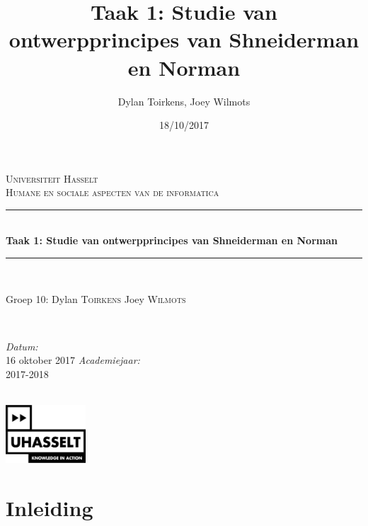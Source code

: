 \documentclass[11pt]{article}
\author{Dylan Toirkens, Joey Wilmots}
\title{\textbf{Taak 1: Studie van ontwerpprincipes van Shneiderman en Norman}}
\date{18/10/2017}
\begin{document}
	\begin{titlepage}
		
		\newcommand{\HRule}{\rule{\linewidth}{0.5mm}} %
		
		\begin{center} %
			
			\textsc{\LARGE Universiteit Hasselt}\\[1.5cm] %
			\textsc{\Large Humane en sociale aspecten van de informatica}\\[0.5cm] %
			
			\HRule \\[0.4cm]
			{ \huge \bfseries Taak 1: Studie van ontwerpprincipes van Shneiderman en Norman}\\[0.4cm]
			\HRule \\[1.5cm]
			
			\begin{minipage}{0.5\textwidth}
				\begin{flushleft} \large
					Groep 10:\newline
					Dylan \textsc{Toirkens}\newline
					Joey \textsc{Wilmots}
				\end{flushleft}
			\end{minipage}
			~
			\begin{minipage}{0.3\textwidth}
				\begin{flushright} \large
					\emph{Datum:}\\
					16 oktober 2017
					\emph{Academiejaar: } \\
					2017-2018
				\end{flushright}
			\end{minipage}\\[3cm]
			\vspace{25 mm}
			\includegraphics[width=3.0cm]{UHasselt-logo.jpg}\\[2.0cm]  
		\end{center}
	\end{titlepage}
\newpage
\tableofcontents
\clearpage

\section{Inleiding}
\end{document}
